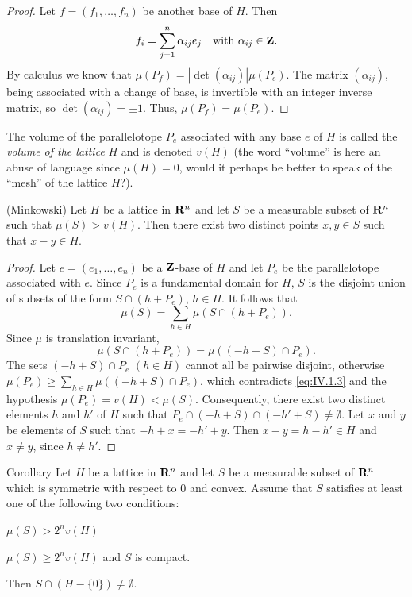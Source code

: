 \begin{proof}
Let $f=(f_{1},\ldots,f_{n})$ be another base of $H$. Then
\[
f_{i}=\sum_{j=1}^{n}\alpha_{ij}e_{j}\quad\text{with }\alpha_{ij}\in\mathbf{Z}.
\]
By calculus we know that $\mu(P_{f})=|\det(\alpha_{ij})|\mu(P_{e})$. The
matrix $(\alpha_{ij})$, being associated with a change of base, is
invertible with an integer inverse matrix, so $\det(\alpha_{ij})=\pm1$.
Thus, $\mu(P_{f})=\mu(P_{e})$.
\end{proof}

The volume of the parallelotope $P_{e}$ associated with any base $e$ of $H$
is called the \emph{volume of the lattice} $H$ and is denoted $v(H)$ (the
word ``volume'' is here an abuse of language since $\mu(H)=0$, would it
perhaps be better to speak of the ``mesh'' of the lattice $H$?).

\begin{theorem}
\label{thm:IV.1.2}
\textnormal{(Minkowski)} Let $H$ be a lattice in $\mathbf{R}^{n}$ and let $S$ be a measurable subset of
$\mathbf{R}^{n}$ such that $\mu(S)>v(H)$. Then there exist two distinct points
$x,y\in S$ such that $x-y\in H$.
\end{theorem}

\begin{proof}
Let $e=(e_{1},\ldots,e_{n})$ be a $\mathbf{Z}$-base of $H$ and let $P_{e}$ be the
parallelotope associated with $e$. Since $P_{e}$ is a fundamental domain for
$H$, $S$ is the disjoint union of subsets of the form $S\cap(h+P_{e})$,
$h\in H$. It follows that
\begin{equation}
\mu(S)=\sum_{h\in H}\mu(S\cap(h+P_{e})).
\label{eq:IV.1.3}
\end{equation}
Since $\mu$ is translation invariant,
\[
\mu(S\cap(h+P_{e}))=\mu((-h+S)\cap P_{e}).
\]
The sets $(-h+S)\cap P_{e}$ $(h\in H)$ cannot all be pairwise disjoint,
otherwise
$\mu(P_{e})\geq\sum_{h\in H}\mu((-h+S)\cap P_{e})$, which contradicts
\eqref{eq:IV.1.3} and the hypothesis $\mu(P_{e})=v(H)<\mu(S)$. Consequently,
there exist two distinct elements $h$ and $h'$ of $H$ such that
$P_{e}\cap(-h+S)\cap(-h'+S)\neq\emptyset$. Let $x$ and $y$ be elements of
$S$ such that $-h+x=-h'+y$. Then $x-y=h-h'\in H$ and $x\neq y$, since
$h\neq h'$.
\end{proof}

\begin{statement}{Corollary}
Let $H$ be a lattice in $\mathbf{R}^{n}$ and let $S$ be a measurable subset of
$\mathbf{R}^{n}$ which is symmetric with respect to $0$ and convex. Assume that $S$
satisfies at least one of the following two conditions:
\begin{alist}
\item $\mu(S)>2^{n}v(H)$
\item $\mu(S)\geq2^{n}v(H)$ and $S$ is compact.
\end{alist}
Then $S\cap(H-\{0\})\neq\emptyset$.
\end{statement}

